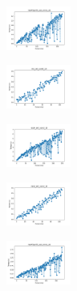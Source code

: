 \begin{figure}[H]
\begin{subfigure}
    \end{subfigure}
    \hfill
    \begin{subfigure}
        \centering
        \includegraphics[width=0.234\textwidth]{img/bl/newthyroid_set_const_10_277451237_time.png}
    \end{subfigure}
    \hfill
    \begin{subfigure}
        \centering
        \includegraphics[width=0.234\textwidth]{img/bl/iris_set_const_10_49258669_time.png}
    \end{subfigure}
    \hfill
    \begin{subfigure}
        \centering
        \includegraphics[width=0.234\textwidth]{img/bl/ecoli_set_const_10_49258669_time.png}
    \end{subfigure}
    \hfill
    \begin{subfigure}
        \centering
        \includegraphics[width=0.234\textwidth]{img/bl/rand_set_const_10_49258669_time.png}
    \end{subfigure}
    \hfill
    \begin{subfigure}
        \centering
        \includegraphics[width=0.234\textwidth]{img/bl/newthyroid_set_const_10_49258669_time.png}
    \end{subfigure}
    \hfill
    \begin{subfigure}

\end{subfigure}
\end{figure}

